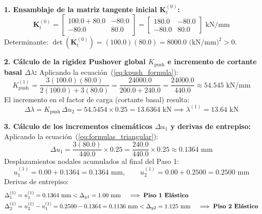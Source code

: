 \documentclass[11pt,letterpaper]{article}
\begin{document}
\begin{stepbox}
\textbf{1. Ensamblaje de la matriz tangente inicial $\mathbf{K}_t^{(0)}$:}
\begin{equation}
    \mathbf{K}_t^{(0)} = 
    \begin{bmatrix}
        100.0 + 80.0 & -80.0 \\
        -80.0 & 80.0
    \end{bmatrix}
    =
    \begin{bmatrix}
        180.0 & -80.0 \\
        -80.0 & 80.0
    \end{bmatrix}\text{ kN/mm}
\end{equation}
Determinante: $\det(\mathbf{K}_t^{(0)}) = (100.0)(80.0) = 8000.0\text{ (kN/mm)}^2 > 0$.

\vspace{0.2cm}
\textbf{2. Cálculo de la rigidez Pushover global $K_{\text{push}}$ e incremento de cortante basal $\Delta \lambda$:}
Aplicando la ecuación~(\ref{eq:kpush_formula}):
\begin{equation}
    K_{\text{push}}^{(1)} = \frac{3(100.0)(80.0)}{2(100.0) + 3(80.0)} = \frac{24000.0}{200.0 + 240.0} = \frac{24000.0}{440.0} \approx 54.545\text{ kN/mm}
\end{equation}
El incremento en el factor de carga (cortante basal) resulta:
\begin{equation}
    \Delta \lambda = K_{\text{push}} \, \Delta u_2 = 54.5454 \times 0.25 = 13.6364\text{ kN} \implies \lambda^{(1)} = 13.64\text{ kN}
\end{equation}

\vspace{0.2cm}
\textbf{3. Cálculo de los incrementos cinemáticos $\Delta u_1$ y derivas de entrepiso:}
Aplicando la ecuación~(\ref{eq:formulas_triangular}):
\begin{equation}
    \Delta u_1 = \frac{3(80.0)}{440.0} \times 0.25 = \frac{240.0}{440.0} \times 0.25 \approx 0.1364\text{ mm}
\end{equation}
Desplazamientos nodales acumulados al final del Paso 1:
\begin{equation}
    u_1^{(1)} = 0.00 + 0.1364 = 0.1364\text{ mm}, \qquad
    u_2^{(1)} = 0.00 + 0.2500 = 0.2500\text{ mm}
\end{equation}
Derivas de entrepiso:
\begin{align}
    \Delta_1^{(1)} &= u_1^{(1)} = 0.1364\text{ mm} < \Delta_{y1} = 1.00\text{ mm} \quad \implies \text{\textbf{Piso 1 Elástico}} \\
    \Delta_2^{(1)} &= u_2^{(1)} - u_1^{(1)} = 0.2500 - 0.1364 = 0.1136\text{ mm} < \Delta_{y2} = 1.125\text{ mm} \quad \implies \text{\textbf{Piso 2 Elástico}}
\end{align}


\end{stepbox}
\end{document}

